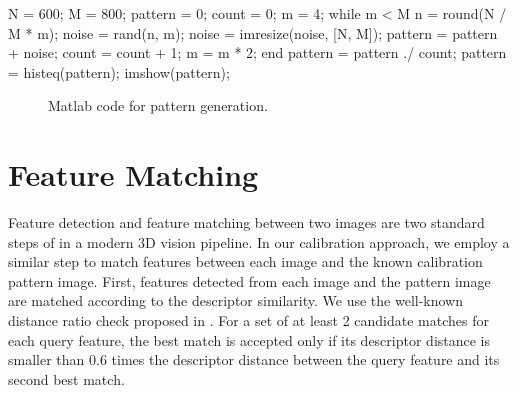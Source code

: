 \documentclass{report}
\begin{document}
\small
\begin{verbbox}
N = 600; M = 800;
pattern = 0; count = 0;
m = 4;
while m < M
  n = round(N / M * m);
  noise = rand(n, m);
  noise = imresize(noise, [N, M]);
  pattern = pattern + noise;
  count = count + 1;
  m = m * 2;
end
pattern = pattern ./ count;
pattern = histeq(pattern);
imshow(pattern);
\end{verbbox}
\normalsize

\begin{figure}
  \centering
  \theverbbox
  \caption{Matlab code for pattern generation.}
\end{figure}


\section{Feature Matching}
Feature detection and feature matching between two images are two standard steps of in a modern 3D vision pipeline. In our calibration approach, we employ a similar step to match features between each image and the known calibration pattern image. First, features detected from each image and the pattern image are matched according to the descriptor similarity. We use the well-known distance ratio check proposed in \cite{lowe2004distinctive}. For a set of at least 2 candidate matches for each query feature, the best match is accepted only if its descriptor distance is smaller than 0.6 times the descriptor distance between the query feature and its second best match. 
\end{document}
